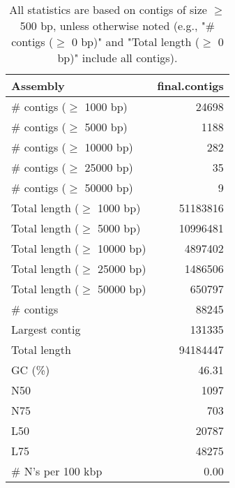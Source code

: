 \documentclass[12pt,a4paper]{article}
\begin{document}
\begin{table}[ht]
\begin{center}
\caption{All statistics are based on contigs of size $\geq$ 500 bp, unless otherwise noted (e.g., "\# contigs ($\geq$ 0 bp)" and "Total length ($\geq$ 0 bp)" include all contigs).}
\begin{tabular}{|l*{1}{|r}|}
\hline
Assembly & final.contigs \\ \hline
\# contigs ($\geq$ 1000 bp) & 24698 \\ \hline
\# contigs ($\geq$ 5000 bp) & 1188 \\ \hline
\# contigs ($\geq$ 10000 bp) & 282 \\ \hline
\# contigs ($\geq$ 25000 bp) & 35 \\ \hline
\# contigs ($\geq$ 50000 bp) & 9 \\ \hline
Total length ($\geq$ 1000 bp) & 51183816 \\ \hline
Total length ($\geq$ 5000 bp) & 10996481 \\ \hline
Total length ($\geq$ 10000 bp) & 4897402 \\ \hline
Total length ($\geq$ 25000 bp) & 1486506 \\ \hline
Total length ($\geq$ 50000 bp) & 650797 \\ \hline
\# contigs & 88245 \\ \hline
Largest contig & 131335 \\ \hline
Total length & 94184447 \\ \hline
GC (\%) & 46.31 \\ \hline
N50 & 1097 \\ \hline
N75 & 703 \\ \hline
L50 & 20787 \\ \hline
L75 & 48275 \\ \hline
\# N's per 100 kbp & 0.00 \\ \hline
\end{tabular}
\end{center}
\end{table}
\end{document}
